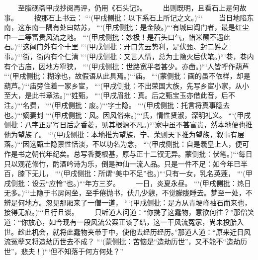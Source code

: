 \documentclass[
    ref = refDemo.bib,
    coverpage = cover.pdf,
    geometry = b5,
    lang = cn
]{spBook}
\begin{document}
    　　至脂砚斋甲戌抄阅再评，仍用《石头记》。  
    　　出则既明，且看石上是何故事。  
    　　按那石上书云： ```(甲戌侧批：以下系石上所记之文。)```  
    　　当日地陷东南，这东南一隅有处曰姑苏， ```(甲戌侧批：是金陵。)```有城曰阊门者，最是红尘中一二等富贵风流之地。 ```(甲戌侧批：妙极！是石头口气，惜米颠不遇此石。)```这阊门外有个十里 ```(甲戌侧批：开口先云势利，是伏甄、封二姓之事。)```街，街内有个仁清 ```(甲戌侧批：又言人情，总为士隐火后伏笔。)```巷，巷内有个古庙，因地方窄狭， ```(甲戌侧批：世路宽平者甚少。亦凿。)```人皆呼作葫芦 ```(甲戌侧批：糊涂也，故假语从此具焉。)```庙。 ```(蒙侧批：画的虽不依样，却是葫芦。)```庙旁住着一家乡宦， ```(甲戌侧批：不出荣国大族，先写乡宦小家，从小至大，是此书章法。)```姓甄， ```(甲戌眉批：真。后之甄宝玉亦借此音，后不注。)```名费， ```(甲戌侧批：废。)```字士隐。 ```(甲戌侧批：托言将真事隐去也。)```嫡妻封 ```(甲戌侧批：风。因风俗来。)```氏，情性贤淑，深明礼义。 ```(甲戌侧批：八字正是写日后之香菱，见其根源不凡。)```家中虽不甚富贵，然本地便也推他为望族了。 ```(甲戌侧批：本地推为望族，宁、荣则天下推为望族，叙事有层落。)```因这甄士隐禀性恬淡，不以功名为念， ```(甲戌侧批：自是羲皇上人，便可作是书之朝代年纪矣。总写香菱根基，原与正十二钗无异。蒙侧批：伏笔。)```每日只以观花修竹，酌酒吟诗为乐，倒是神仙一流人品。只是一件不足：如今年已半百，膝下无儿， ```(甲戌侧批：所谓“美中不足”也。)```只有一女，乳名英莲， ```(甲戌侧批：设云“应怜”也。)```年方三岁。  
    　　一日，炎夏永昼。 ```(甲戌侧批：热日无多。)```士隐于书房闲坐，至手倦抛书，伏几少憩，不觉朦胧睡去。梦至一处，不辨是何地方。忽见那厢来了一僧一道， ```(甲戌侧批：是方从青埂峰袖石而来也，接得无痕。)```且行且谈。  
    　　只听道人问道：“你携了这蠢物，意欲何往？”那僧笑道：“你放心，如今现有一段风流公案正该了结，这一干风流冤家，尚未投胎入世。趁此机会，就将此蠢物夹带于中，使他去经历经历。”那道人道：“原来近日风流冤孽又将造劫历世去不成？ ```(蒙侧批：苦恼是“造劫历世”，又不能不“造劫历世”，悲夫！)```但不知落于何方何处？”  
\end{document}
